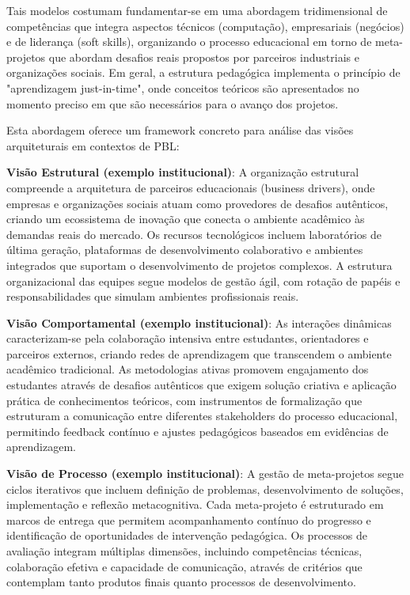 \documentclass[12pt,a4paper]{article}
\begin{document}
Tais modelos costumam fundamentar-se em uma abordagem tridimensional de competências
que integra aspectos técnicos (computação), empresariais (negócios) e de
liderança (soft skills), organizando o processo educacional em torno de
meta-projetos que abordam desafios reais propostos por parceiros industriais e
organizações sociais. Em geral, a estrutura pedagógica implementa o princípio
de "aprendizagem just-in-time", onde conceitos teóricos são apresentados no
momento preciso em que são necessários para o avanço dos projetos.

Esta abordagem oferece um framework concreto para análise das visões
arquiteturais em contextos de PBL:

\textbf{Visão Estrutural (exemplo institucional)}: A organização estrutural compreende a arquitetura de parceiros educacionais (business drivers), onde empresas e organizações sociais atuam como provedores de desafios autênticos, criando um ecossistema de inovação que conecta o ambiente acadêmico às demandas reais do mercado. Os recursos tecnológicos incluem laboratórios de última geração, plataformas de desenvolvimento colaborativo e ambientes integrados que suportam o desenvolvimento de projetos complexos. A estrutura organizacional das equipes segue modelos de gestão ágil, com rotação de papéis e responsabilidades que simulam ambientes profissionais reais.

\textbf{Visão Comportamental (exemplo institucional)}: As interações dinâmicas caracterizam-se pela colaboração intensiva entre estudantes, orientadores e parceiros externos, criando redes de aprendizagem que transcendem o ambiente acadêmico tradicional. As metodologias ativas promovem engajamento dos estudantes através de desafios autênticos que exigem solução criativa e aplicação prática de conhecimentos teóricos, com instrumentos de formalização que estruturam a comunicação entre diferentes stakeholders do processo educacional, permitindo feedback contínuo e ajustes pedagógicos baseados em evidências de aprendizagem.

\textbf{Visão de Processo (exemplo institucional)}: A gestão de meta-projetos segue ciclos iterativos que incluem definição de problemas, desenvolvimento de soluções, implementação e reflexão metacognitiva. Cada meta-projeto é estruturado em marcos de entrega que permitem acompanhamento contínuo do progresso e identificação de oportunidades de intervenção pedagógica. Os processos de avaliação integram múltiplas dimensões, incluindo competências técnicas, colaboração efetiva e capacidade de comunicação, através de critérios que contemplam tanto produtos finais quanto processos de desenvolvimento.
\end{document}
